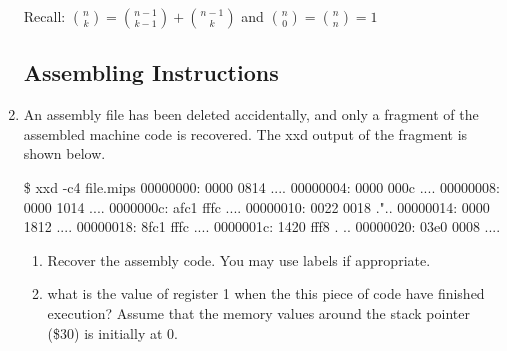 \documentclass[12pt]{article}
\begin{document}
\begin{enumerate}
    Recall:
    $\binom{n}{k} = \binom{n−1}{k−1} + \binom{n−1}{k} $ and $\binom{n}{0} = \binom{n}{n} = 1$
    
    \subsection{Assembling Instructions}
    \item An assembly file has been deleted accidentally, and only a fragment of the assembled machine code
    is recovered. The xxd output of the fragment is shown below.
    \begin{spverbatim}
    \$ xxd -c4 file.mips
    00000000: 0000 0814 ....
    00000004: 0000 000c ....
    00000008: 0000 1014 ....
    0000000c: afc1 fffc ....
    00000010: 0022 0018 ."..
    00000014: 0000 1812 ....
    00000018: 8fc1 fffc ....
    0000001c: 1420 fff8 . ..
    00000020: 03e0 0008 ....
    \end{spverbatim}
\begin{enumerate}
	\item Recover the assembly code. You may use labels if appropriate.
	\item what is the value of register 1 when the this piece of code have finished execution? Assume that
	the memory values around the stack pointer (\$30) is initially at 0.
\end{enumerate}

\end{enumerate}
\end{document}

